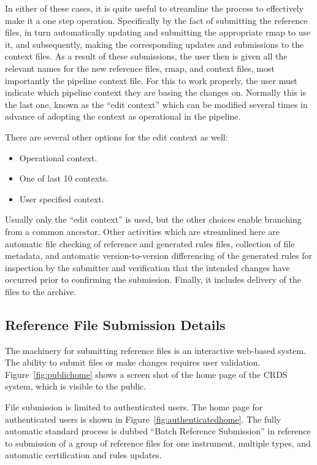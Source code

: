 \documentclass[final,authoryear,5p,times,twocolumn]{elsarticle}
\begin{document}
In either of these cases, it is quite useful to streamline the process to
effectively make it a one step operation.
Specifically by the fact of submitting the reference
files, in turn automatically updating and submitting
the appropriate rmap to use it,
and subsequently, making the corresponding updates and submissions to the context
files. As a result of these submissions, the user then is given all the
relevant names for the new reference files, rmap, and context files, most
importantly the pipeline context file. For this to work properly, the user must
indicate which pipeline context they are basing the changes on. Normally this
is the last one,  known as the ``edit context'' which can be modified several
times in advance of adopting the context as operational in the pipeline.  

There are several other options for the edit context as well: 

\begin{itemize}
\item Operational context.
\item One of last 10 contexts.
\item User specified context.  
\end{itemize}

Usually only the ``edit context'' is used, but the other choices
enable branching from a common ancestor.  Other activities which are
streamlined here are automatic file checking of reference and generated rules
files, collection of file metadata, and automatic version-to-version
differencing of the generated rules for inspection by the submitter and
verification that the intended changes have occurred prior to confirming
the submission.  Finally, it includes delivery of the files to the archive.

\subsection{Reference File Submission Details}

The machinery for submitting reference files is an interactive web-based
system. The ability to submit files or make changes requires user
validation. Figure~\ref{fig:publichome} 
shows a screen shot of the home page of the CRDS
system, which is visible to the public. 

File submission is limited to authenticated users. The home page for
authenticated users is shown in Figure~\ref{fig:authenticatedhome}.
The fully automatic
standard process is dubbed ``Batch Reference Submission'' 
in reference to submission of a group of reference 
files for one instrument,
multiple types,  and automatic certification and rules updates.
\end{document}
